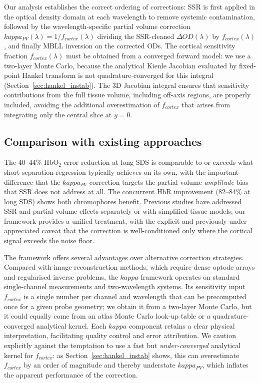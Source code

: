 \documentclass[11pt]{article}
\def\kappa{kappa}%
\def\mathrm#1{#1}%
\begin{document}
Our analysis establishes the correct ordering of corrections: SSR is first applied in the optical density domain at each wavelength to remove systemic contamination\cite{r15}, followed by the wavelength-specific partial volume correction $\kappa_{\mathrm{PV}}(\lambda) = 1/f_{\mathrm{cortex}}(\lambda)$ dividing the SSR-cleaned $\Delta\mathrm{OD}(\lambda)$ by $f_{\mathrm{cortex}}(\lambda)$, and finally MBLL inversion on the corrected ODs. The cortical sensitivity fraction $f_{\mathrm{cortex}}(\lambda)$ must be obtained from a converged forward model: we use a two-layer Monte Carlo, because the analytical Kienle Jacobian evaluated by fixed-point Hankel transform is not quadrature-converged for this integral (Section~\ref{sec:hankel_instab}). The 3D Jacobian integral ensures that sensitivity contributions from the full tissue volume, including off-axis regions, are properly included, avoiding the additional overestimation of $f_{\mathrm{cortex}}$ that arises from integrating only the central slice at $y = 0$.

\subsection{Comparison with existing approaches}

The 40--44\% HbO$_2$ error reduction at long SDS is comparable to or exceeds what short-separation regression typically achieves on its own\cite{r18,r19}, with the important difference that the $\kappa_{\mathrm{PV}}$ correction targets the partial-volume \emph{amplitude} bias that SSR does not address at all. The concurrent HbR improvement (82--84\% at long SDS) shows both chromophores benefit. Previous studies have addressed SSR and partial volume effects separately or with simplified tissue models; our framework provides a unified treatment, with the explicit and previously under-appreciated caveat that the correction is well-conditioned only where the cortical signal exceeds the noise floor.

The framework offers several advantages over alternative correction strategies. Compared with image reconstruction methods\cite{r13}, which require dense optode arrays and regularised inverse problems, the $\kappa$ framework operates on standard single-channel measurements and two-wavelength systems. Its sensitivity input $f_{\mathrm{cortex}}$ is a single number per channel and wavelength that can be precomputed once for a given probe geometry; we obtain it from a two-layer Monte Carlo, but it could equally come from an atlas Monte Carlo look-up table or a quadrature-converged analytical kernel. Each $\kappa$ component retains a clear physical interpretation, facilitating quality control and error attribution. We caution explicitly against the temptation to use a fast but \emph{under-converged} analytical kernel for $f_{\mathrm{cortex}}$: as Section~\ref{sec:hankel_instab} shows, this can overestimate $f_{\mathrm{cortex}}$ by an order of magnitude and thereby understate $\kappa_{\mathrm{PV}}$, which inflates the apparent performance of the correction.
\end{document}
